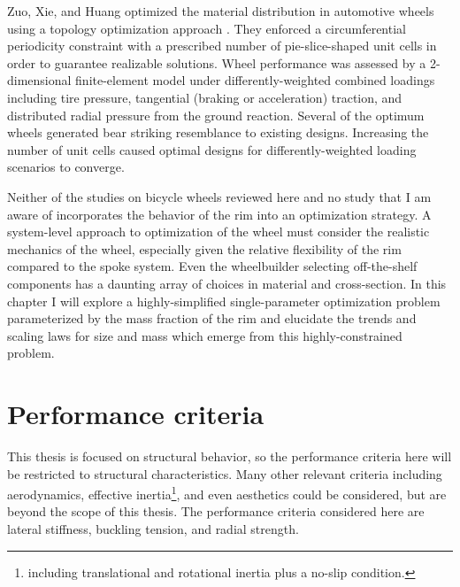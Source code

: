 \documentclass[\rootdir/thesis.tex]{subfiles}
\begin{document}
Zuo, Xie, and Huang optimized the material distribution in automotive wheels using a topology optimization approach \cite{Zuo2011}. They enforced a circumferential periodicity constraint with a prescribed number of pie-slice-shaped unit cells in order to guarantee realizable solutions. Wheel performance was assessed by a 2-dimensional finite-element model under differently-weighted combined loadings including tire pressure, tangential (braking or acceleration) traction, and distributed radial pressure from the ground reaction. Several of the optimum wheels generated bear striking resemblance to existing designs. Increasing the number of unit cells caused optimal designs for differently-weighted loading scenarios to converge.



Neither of the studies on bicycle wheels \cite{Svensson2015,Keller2013} reviewed here and no study that I am aware of incorporates the behavior of the rim into an optimization strategy. A system-level approach to optimization of the wheel must consider the realistic mechanics of the wheel, especially given the relative flexibility of the rim compared to the spoke system. Even the wheelbuilder selecting off-the-shelf components has a daunting array of choices in material and cross-section. In this chapter I will explore a highly-simplified single-parameter optimization problem parameterized by the mass fraction of the rim and elucidate the trends and scaling laws for size and mass which emerge from this highly-constrained problem.


\section{Performance criteria}

This thesis is focused on structural behavior, so the performance criteria here will be restricted to structural characteristics. Many other relevant criteria including aerodynamics, effective inertia\footnote{including translational and rotational inertia plus a no-slip condition.}, and even aesthetics could be considered, but are beyond the scope of this thesis. The performance criteria considered here are lateral stiffness, buckling tension, and radial strength.
\end{document}

